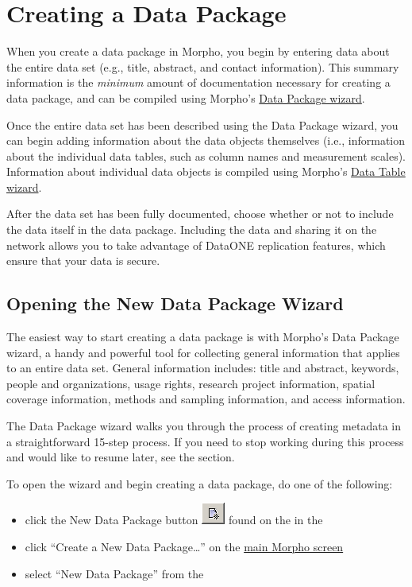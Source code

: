 \section{Creating a Data Package } \label{sec:creating}

When you create a data package in Morpho, you begin by entering data
about the entire data set (e.g., title, abstract, and contact
information). This summary information is the \emph{minimum} amount of
documentation necessary for creating a data package, and can be compiled
using Morpho's \hyperref[sec:wizard-newdp]{Data Package wizard}.

Once the entire data set has been described using the Data Package
wizard, you can begin adding information about the data objects
themselves (i.e., information about the individual data tables, such as
column names and measurement scales). Information about individual data
objects is compiled using Morpho's \hyperref[sec:wizard-newtable]{Data
Table wizard}. 

After the data set has been fully documented, choose whether or not to
include the data itself in the data package. Including the data and
sharing it on the network allows you to take advantage of DataONE 
replication features, which ensure that your data is secure.

\subsection{Opening the New Data Package Wizard} \label{sec:wizard-newdp}

The easiest way to start creating a data package is with Morpho's Data
Package wizard, a handy and powerful tool for collecting general
information that applies to an entire data set. General information
includes: title and abstract, keywords, people and organizations, usage
rights, research project information, spatial coverage information,
methods and sampling information, and access information. 

The Data Package wizard walks you through the process of creating
metadata in a straightforward 15-step process. If you need to stop
working during this process and would like to resume later, see the
 section.

To open the wizard and begin creating a data package, do one of the
following:
\begin{itemize}
  \setlength{\parskip}{1pt}
  \item click the New Data Package button
    \includegraphics[scale=0.7]{images/button-new-dp.png} found on the
    in the 
  \item click ``Create a New Data Package\ldots'' on the
    \hyperref[sec:panel-work]{main Morpho screen}
  \item select ``New Data Package'' from the 
\end{itemize}

